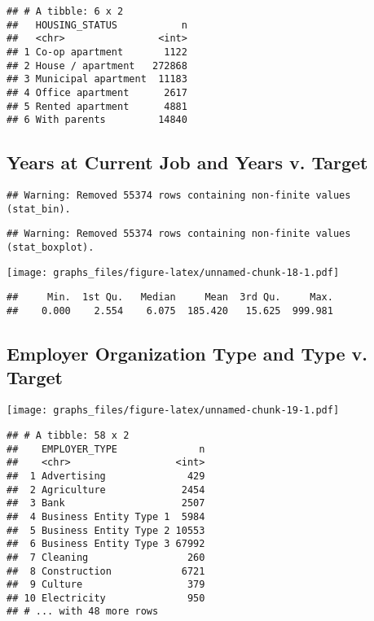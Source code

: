 \documentclass[]{article}
\begin{document}
\begin{verbatim}
## # A tibble: 6 x 2
##   HOUSING_STATUS           n
##   <chr>                <int>
## 1 Co-op apartment       1122
## 2 House / apartment   272868
## 3 Municipal apartment  11183
## 4 Office apartment      2617
## 5 Rented apartment      4881
## 6 With parents         14840
\end{verbatim}

\subsection{Years at Current Job and Years v.
Target}\label{years-at-current-job-and-years-v.-target}

\begin{verbatim}
## Warning: Removed 55374 rows containing non-finite values (stat_bin).
\end{verbatim}

\begin{verbatim}
## Warning: Removed 55374 rows containing non-finite values (stat_boxplot).
\end{verbatim}

\texttt{[image: graphs\_files/figure-latex/unnamed-chunk-18-1.pdf]}

\begin{verbatim}
##     Min.  1st Qu.   Median     Mean  3rd Qu.     Max. 
##    0.000    2.554    6.075  185.420   15.625  999.981
\end{verbatim}

\subsection{Employer Organization Type and Type v.
Target}\label{employer-organization-type-and-type-v.-target}

\texttt{[image: graphs\_files/figure-latex/unnamed-chunk-19-1.pdf]}

\begin{verbatim}
## # A tibble: 58 x 2
##    EMPLOYER_TYPE              n
##    <chr>                  <int>
##  1 Advertising              429
##  2 Agriculture             2454
##  3 Bank                    2507
##  4 Business Entity Type 1  5984
##  5 Business Entity Type 2 10553
##  6 Business Entity Type 3 67992
##  7 Cleaning                 260
##  8 Construction            6721
##  9 Culture                  379
## 10 Electricity              950
## # ... with 48 more rows
\end{verbatim}
\end{document}
